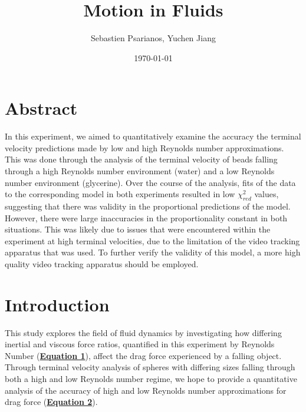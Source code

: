 \documentclass[
	letterpaper
	12pt
]{template}
\newcommand{\bref}[2]{\textbf{\hyperref[#1]{#2}}}
\begin{document}
\title{Motion in Fluids}

\author{Sebastien Psarianos, Yuchen Jiang}

\date{\today}
\maketitle
\section{Abstract}
In this experiment, we aimed to quantitatively examine the accuracy the terminal velocity predictions made by low and high Reynolds number approximations. This was done through the analysis of the terminal velocity of beads falling through a high Reynolds number environment (water) and a low Reynolds number environment (glycerine). Over the course of the analysis, fits of the data to the corresponding model in both experiments resulted in low $\chi_{red}^2$ values, suggesting that there was validity in the proportional predictions of the model. However, there were large inaccuracies in the proportionality constant in both situations. This was likely due to issues that were encountered within the experiment at high terminal velocities, due to the limitation of the video tracking apparatus that was used. To further verify the validity of this model, a more high quality video tracking apparatus should be employed.

\section{Introduction}
This study explores the field of fluid dynamics by investigating how differing inertial and viscous force ratios, quantified in this experiment by Reynolds Number (\bref{eqn::reynolds}{Equation 1}), affect the drag force experienced by a falling object. Through terminal velocity analysis of spheres with differing sizes falling through both a high and low Reynolds number regime, we hope to provide a quantitative analysis of the accuracy of high and low Reynolds number approximations for drag force (\bref{eqn::dragForce}{Equation 2}).
\end{document}
